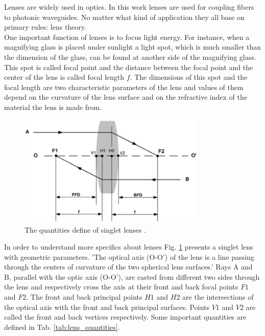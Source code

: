 Lenses are widely used in optics. In this work lenses are used for coupling fibers to photonic waveguides. No matter what kind of application they all base on primary rules: lens theory.\\

One important function of lenses is to focus light energy. For instance, when a magnifying glass is placed under sunlight a light spot, which is much smaller than the dimension of the glass, can be found at another side of the magnifying glass. This spot is called focal point and the distance between the focal point and the center of the lens is called focal length $f$. The dimensions of this spot and the focal length are two characteristic parameters of the lens and values of them depend on the curvature of the lens surface and on the refractive index of the material the lens is made from. \\

\begin{figure}[!ht]
\centering
\includegraphics[width=0.8\textwidth]{bilder/lens_define}
\caption{The quantities define of singlet lenses \cite{lens_theory_LC_Ltd}.}
\label{fig:lens_define}
\end{figure}
In order to understand more specifics about lenses Fig. \ref{fig:lens_define}  presents a singlet lens with geometric parameters. 'The optical axis (O-O') of the lens is a line passing through the centers of curvature of the two spherical lens surfaces.'  
Rays A and B, parallel with the optic axis (O-O'), are casted from different two sides through the lens and respectively cross the axis at their front and back focal points $F1$ and $F2$. The front and back principal points $H1$ and $H2$ are the intersections of the optical axis with the front and back principal surfaces. Points $V1$ and $V2$ are called the front and back vertices respectively\cite{lens_theory_LC_Ltd}.  Some important quantities are defined in Tab. \ref{tab:lens_quantities}. \\


